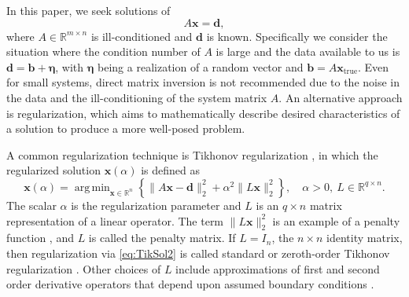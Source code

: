 \documentclass[12pt]{article}
\newcommand{\mA}{m}	%
\newcommand{\mL}{q}	%
\newcommand{\bVec}{\mathbf{b}}	%
\newcommand{\dVec}{\mathbf{d}}	%
\newcommand{\xVec}{\mathbf{x}}	%
\newcommand{\xTrue}{\mathbf{x}_{\text{true}}}	%
\newcommand{\regparam}{\alpha}  %
\newcommand{\xReg}{\xVec(\regparam)}	%
\DeclareMathOperator*{\argmin}{arg\,min}
\newcommand{\noise}{\eta}	%
\newcommand{\noiseVec}{\bm{\noise}}	%
\begin{document}
In this paper, we seek solutions of 
\begin{equation}
\label{eq:Ax = b}
A\xVec = \dVec,
\end{equation}
where $A \in \mathbb{R}^{\mA \times n}$ is ill-conditioned and $\dVec$ is known. Specifically we consider the situation where the condition number of $A$ is large and the data available to us is $\dVec = \bVec + \noiseVec$, with $\noiseVec$ being a realization of a random vector and $\bVec = A\xTrue$. Even for small systems, direct matrix inversion is not recommended due to the noise in the data and the ill-conditioning of the system matrix $A$. An alternative approach is regularization, which aims to mathematically describe desired characteristics of a solution to produce a more well-posed problem. \par
A common regularization technique is Tikhonov regularization \cite{Tikh1963}, in which the regularized solution $\xReg$ is defined as
\begin{equation}
\label{eq:TikSol2}
\xVec(\regparam) = \argmin_{\xVec \in \mathbb{R}^n} \left\{\|A\xVec - \dVec\|_2^2 + \regparam^2\|L\xVec\|_2^2\right\}, \quad \regparam > 0, ~ L \in \mathbb{R}^{\mL \times n}.
\end{equation}
The scalar $\regparam$ is the regularization parameter and $L$ is an $\mL \times n$ matrix representation of a linear operator. The term $\|L\xVec\|_2^2$ is an example of a penalty function \cite{Vogel:2002}, and $L$ is called the penalty matrix. If $L = I_n$, the $n \times n$ identity matrix, then regularization via \eqref{eq:TikSol2} is called standard or zeroth-order Tikhonov regularization \cite{ABT}. Other choices of $L$ include approximations of first and second order derivative operators that depend upon assumed boundary conditions \cite{NeumannDCT,Strang1999,Vogel:2002}. \par 
\end{document}

